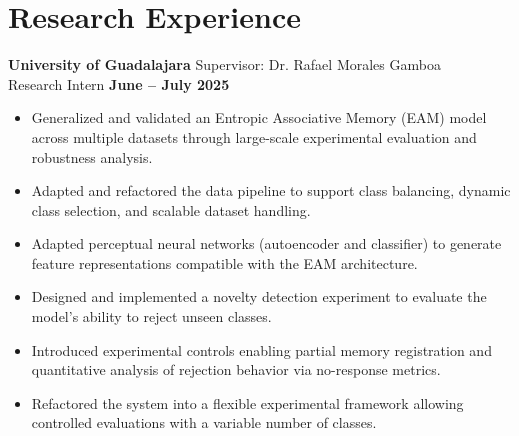 \documentclass[11pt]{article}
\begin{document}
\section*{Research Experience}
\textbf{University of Guadalajara} \hfill Supervisor: Dr. Rafael Morales Gamboa \\
Research Intern \hfill \textbf{June -- July 2025}
\vspace{-0.3cm}
\begin{itemize}[leftmargin=*]
    \item Generalized and validated an Entropic Associative Memory (EAM) model across multiple datasets through large-scale experimental evaluation and robustness analysis.
    \vspace{-0.3cm}
    \item Adapted and refactored the data pipeline to support class balancing, dynamic class selection, and scalable dataset handling.
    \vspace{-0.3cm}
    \item Adapted perceptual neural networks (autoencoder and classifier) to generate feature representations compatible with the EAM architecture.
    \vspace{-0.3cm}
    \item Designed and implemented a novelty detection experiment to evaluate the model’s ability to reject unseen classes.
    \vspace{-0.3cm}
    \item Introduced experimental controls enabling partial memory registration and quantitative analysis of rejection behavior via no-response metrics.
    \vspace{-0.3cm}
    \item Refactored the system into a flexible experimental framework allowing controlled evaluations with a variable number of classes.
\end{itemize}




\end{document}
